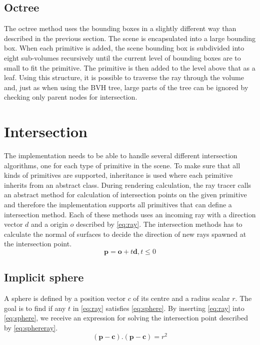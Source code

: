 \documentclass[]{report}   %
\begin{document}
\subsection{Octree}
The octree method uses the bounding boxes in a slightly different way than described in the previous section.
The scene is encapsulated into a large bounding box.
When each primitive is added, the scene bounding box is subdivided into eight sub-volumes recursively until the current level of bounding boxes are to small to fit the primitive.
The primitive is then added to the level above that as a leaf.
Using this structure, it is possible to traverse the ray through the volume and, just as when using the BVH tree, large parts of the tree can be ignored by checking only parent nodes for intersection.

\section{Intersection}
The implementation needs to be able to handle several different intersection algorithms, one for each type of primitive in the scene.
To make sure that all kinds of primitives are supported, inheritance is used where each primitive inherits from an abstract class.
During rendering calculation, the ray tracer calls an abstract method for calculation of intersection points on the given primitive and therefore the implementation supports all primitives that can define a intersection method.
Each of these methods uses an incoming ray with a direction vector $d$ and a origin $o$ described by \autoref{eq:ray}.
The intersection methods has to calculate the normal of surfaces to decide the direction of new rays spawned at the intersection point.
\begin{equation} \label{eq:ray}
\mathbf{p} = \mathbf{o} + t \mathbf{d}, t \leq 0
\end{equation}

\subsection{Implicit sphere}
A sphere is defined by a position vector $c$ of its centre and a radius scalar $r$. 
The goal is to find if any $t$ in \autoref{eq:ray} satisfies \autoref{eq:sphere}. By inserting \autoref{eq:ray} into \autoref{eq:sphere}, we receive an expression for solving the intersection point described by \autoref{eq:sphereray}.
\begin{equation} \label{eq:sphere}
(\mathbf{p} - \mathbf{c}).(\mathbf{p} - \mathbf{c}) = r^2
\end{equation}
\end{document}
